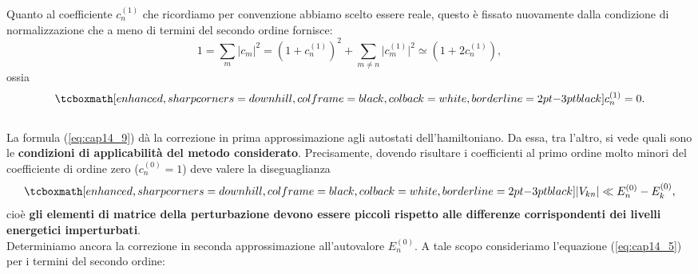 \documentclass[a4paper,12pt,oneside]{book}
\begin{document}
Quanto al coefficiente $c_n ^{(1)}$ che ricordiamo per convenzione abbiamo scelto essere reale, questo è fissato nuovamente dalla condizione di normalizzazione che a meno di termini del secondo ordine fornisce:
	\begin{equation}
		1= \sum _m \vert c_m \vert ^2 = \left( 1+ c_n ^{(1)}\right) ^2+ \sum _{m\neq n } \vert c_m ^{(1)} \vert ^2 \simeq \left( 1+ 2c_n ^{(1)}\right),
	\end{equation}
ossia
	\begin{equation}
		\tcboxmath[enhanced, sharp corners=downhill, colframe=black, colback=white, borderline={2pt}{-3pt}{black}]{
			c_n ^{(1)} =0.
			}
	\label{eq:cap14_10}
	\end{equation}\\
	
La formula (\ref{eq:cap14_9}) dà la correzione in prima approssimazione agli autostati dell'hamiltoniano. Da essa, tra l'altro, si vede quali sono le \textbf{condizioni di applicabilità del metodo considerato}. Precisamente, dovendo risultare i coefficienti al primo ordine molto minori del coefficiente di ordine zero ($c_n ^{(0)} =1$) deve valere la diseguaglianza
	\begin{equation}
		\tcboxmath[enhanced, sharp corners=downhill, colframe=black, colback=white, borderline={2pt}{-3pt}{black}]{
			\vert V_{kn} \vert \ll E_ n ^{(0)}-E_ k ^{(0)},
		}
	\end{equation}
cioè \textbf{gli elementi di matrice della perturbazione devono essere piccoli rispetto alle differenze corrispondenti dei livelli energetici imperturbati}.\\

Determiniamo ancora la correzione in seconda approssimazione all'autovalore $E_n ^{(0)}$. A tale scopo consideriamo l'equazione (\ref{eq:cap14_5}) per i termini del secondo ordine:\\
\end{document}
